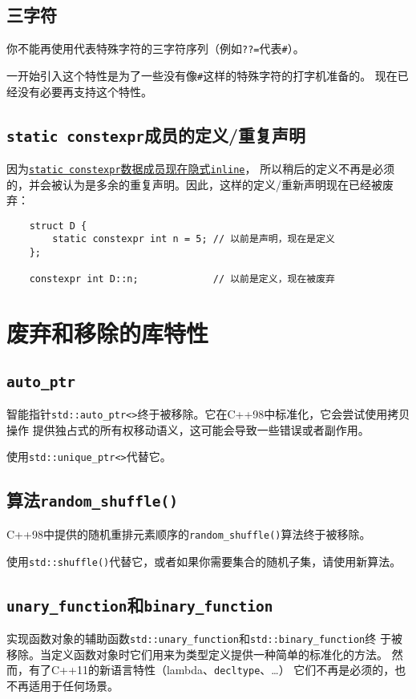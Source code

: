 \subsection{三字符}
你不能再使用代表特殊字符的三字符序列（例如\texttt{??=}代表\texttt{\#}）。

一开始引入这个特性是为了一些没有像\texttt{\#}这样的特殊字符的打字机准备的。
现在已经没有必要再支持这个特性。

\subsection{\texttt{static constexpr}成员的定义/重复声明}
因为\hyperref[ch3.3]{\texttt{static constexpr}数据成员现在隐式\texttt{inline}}，
所以稍后的定义不再是必须的，并会被认为是多余的重复声明。因此，这样的定义/重新声明现在已经被废弃：
\begin{lstlisting}
    struct D {
        static constexpr int n = 5; // 以前是声明，现在是定义
    };

    constexpr int D::n;             // 以前是定义，现在被废弃
\end{lstlisting}


\section{废弃和移除的库特性}

\subsection{\texttt{auto\_ptr}}
智能指针\texttt{std::auto\_ptr<>}终于被移除。它在C++98中标准化，它会尝试使用拷贝操作
提供独占式的所有权移动语义，这可能会导致一些错误或者副作用。

使用\texttt{std::unique\_ptr<>}代替它。

\subsection{算法\texttt{random\_shuffle()}}
C++98中提供的随机重排元素顺序的\texttt{random\_shuffle()}算法终于被移除。

使用\texttt{std::shuffle()}代替它，或者如果你需要集合的随机子集，请使用新算法。

\subsection{\texttt{unary\_function}和\texttt{binary\_function}}
实现函数对象的辅助函数\texttt{std::unary\_function}和\texttt{std::binary\_function}终
于被移除。当定义函数对象时它们用来为类型定义提供一种简单的标准化的方法。
然而，有了C++11的新语言特性（lambda、\texttt{decltype}、\ldots）
它们不再是必须的，也不再适用于任何场景。

